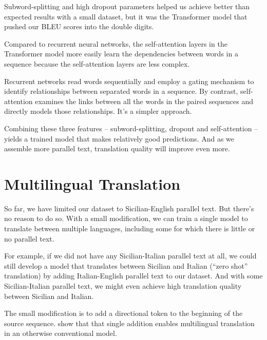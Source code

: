 \documentclass[10pt,letterpaper]{article}
\begin{document}

Subword-splitting and high dropout parameters helped us achieve better than expected results with
a small dataset, but it was the Transformer model that pushed our BLEU scores into the double digits.

Compared to recurrent neural networks, the self-attention layers in the Transformer model more easily
learn the dependencies between words in a sequence because the self-attention layers are less complex.

Recurrent networks read words sequentially and employ a gating mechanism to identify relationships
between separated words in a sequence.  By contrast, self-attention examines the links between all the words
in the paired sequences and directly models those relationships. It's a simpler approach.
      
Combining these three features -- subword-splitting, dropout and self-attention --
yields a trained model that makes relatively good predictions.
And as we assemble more parallel text, translation quality will improve even more.
      

\hypertarget{multilingual}{}

\section*{Multilingual Translation}

So far, we have limited our dataset to Sicilian-English parallel text.  But there's no reason to do so.
With a small modification, we can train a single model to translate between multiple languages,
including some for which there is little or no parallel text.
      
For example, if we did not have any Sicilian-Italian parallel text at all, we could still develop a model 
that translates between Sicilian and Italian (``zero shot'' translation) by adding Italian-English parallel text
to our dataset.  And with some Sicilian-Italian parallel text, we might even achieve high translation quality
between Sicilian and Italian.
      
The small modification is to add a directional token to the beginning of the source sequence.
\citet{johnson2017zeroshot} show that that single addition enables multilingual translation
in an otherwise conventional model.
      
\end{document}
